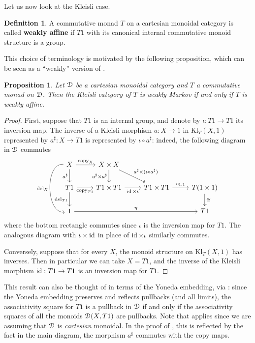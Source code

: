 \documentclass[a4paper,UKenglish,numberwithinsect,cleveref, autoref, thm-restate]{lipics-v2021}
\theoremstyle{plain} %
\newtheorem{myproposition}[mytheorem]{Proposition}
\theoremstyle{definition} %
\newtheorem{mydefinition}[mytheorem]{Definition}
\begin{document}
Let us now look at the Kleisli case.

\begin{mydefinition}\label{defweaklyaffine}
 A commutative monad $T$ on a cartesian monoidal category is called \textbf{weakly affine} if $T1$ with its canonical internal commutative monoid structure is a group.
\end{mydefinition}
%
This choice of terminology is motivated by the following proposition, which can be seen as a ``weakly'' version of .

\begin{myproposition}\label{weaklyboth}
 Let $\mathcal{D}$ be a cartesian monoidal category and $T$ a commutative monad on $\mathcal{D}$. Then the Kleisli category of $T$ is weakly Markov if and only if $T$ is weakly affine.
\end{myproposition}
\begin{proof}
 First, suppose that $T1$ is an internal group, and denote by $\iota:T1\to T1$ its inversion map. 
 The inverse of a Kleisli morphism $a : X \to 1$ in $\mathrm{Kl}_T(X,1)$ represented by $a^\sharp:X\to T1$ is represented by $\iota\circ a^\sharp$: indeed, the following diagram in $\mathcal{D}$ commutes
 \[
  \begin{tikzcd}
  X \ar[bend right=8pc]{dd}[swap]{\mathrm{del}_X} \ar{d}[swap]{a^\sharp} \ar{r}{\mathrm{copy}_X} & X\times X \ar{d}[swap]{a^\sharp\times a^\sharp} \ar{dr}{a^\sharp\times(\iota\circ a^\sharp)} \\
  T1 \ar{d}[swap]{\mathrm{del}_{T1}} \ar{r}[swap]{\mathrm{copy}_{T1}} & T1\times T1 \ar{r}[swap]{\id\times\iota} & T1\times T1 \ar{r}{c_{1,1}} & T(1\times 1) \ar{d}{\cong} \\
  1 \ar{rrr}{\eta} &&& T1
  \end{tikzcd}
 \]
 where the bottom rectangle commutes since $\iota$ is the inversion map for $T1$. The analogous diagram with $\iota\times\operatorname{ id}$ in place of $\operatorname{ id}\times\iota$ 
 similarly commutes.
 
 Conversely, suppose that for every $X$, the monoid structure on $\mathrm{Kl}_T(X,1)$ has inverses. Then in particular we can take $X=T1$, and the inverse of the Kleisli morphism $\operatorname{ id}:T1\to T1$ is an inversion map for $T1$. 
\end{proof}
%
This result can also be thought of in terms of the Yoneda embedding, via : since the Yoneda embedding preserves and reflects pullbacks (and all limits), the associativity square for $T1$ is a pullback in $\mathcal{D}$ if and only if the associativity squares of all the monoids $\mathcal{D}(X,T1)$ are pullbacks.
Note that  applies since we are assuming that $\mathcal{D}$ is \emph{cartesian} monoidal. In the proof of , this is reflected by the fact in the main diagram, the morphism $a^\sharp$ commutes with the copy maps. 
\end{document}
